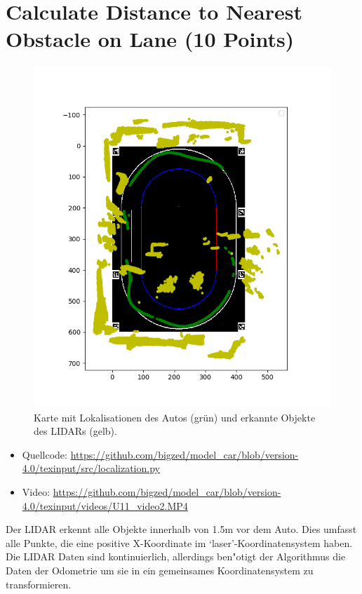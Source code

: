 \documentclass[10pt,oneside,a4paper]{article}
\begin{document}
  \section{Calculate Distance to Nearest Obstacle on Lane (10 Points)}
    \begin{figure}[h]
      \centering
      \includegraphics[scale=0.7]{pictures/circle_with_car_and_obstacles.png}
      \caption{Karte mit Lokalisationen des Autos (grün) und erkannte Objekte des LIDARs (gelb). }
    \end{figure}
    \begin{itemize}
      \item Quellcode: \url{https://github.com/bigzed/model_car/blob/version-4.0/texinput/src/localization.py}
      \item Video: \url{https://github.com/bigzed/model_car/blob/version-4.0/texinput/videos/U11_video2.MP4}
    \end{itemize}

	  Der LIDAR erkennt alle Objekte innerhalb von 1.5m vor dem Auto. Dies umfasst alle Punkte,
    die eine positive X-Koordinate im `laser'-Koordinatensystem haben. Die
    LIDAR Daten sind kontinuierlich, allerdings ben"otigt der Algorithmus die Daten der Odometrie
    um sie in ein gemeinsames Koordinatensystem zu transformieren.
\end{document}

